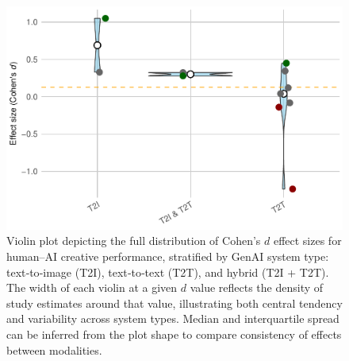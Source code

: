 \documentclass[acmsmall,authorversion]{acmart}
\begin{document}
\begin{figure}[H]
  \centering
  \includegraphics[width=\linewidth]{plot_performance_violin_GenAI}
  \caption{Violin plot depicting the full distribution of Cohen’s $d$ effect sizes for human–AI creative performance, stratified by GenAI system type: text‐to‐image (T2I), text‐to‐text (T2T), and hybrid (T2I + T2T). The width of each violin at a given $d$ value reflects the density of study estimates around that value, illustrating both central tendency and variability across system types. Median and interquartile spread can be inferred from the plot shape to compare consistency of effects between modalities.}
  \label{fig:performance_violin_GenAI}
\end{figure}
\end{document}
